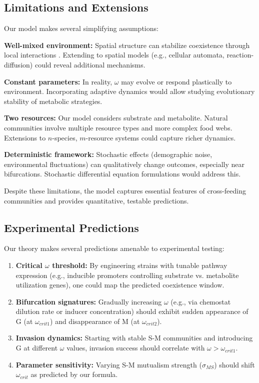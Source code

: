 \documentclass[11pt]{article}
\begin{document}
\subsection{Limitations and Extensions}

Our model makes several simplifying assumptions:

\textbf{Well-mixed environment:} Spatial structure can stabilize coexistence through local interactions \cite{momeni2013strong,dal2014resource}. Extending to spatial models (e.g., cellular automata, reaction-diffusion) could reveal additional mechanisms.

\textbf{Constant parameters:} In reality, $\omega$ may evolve or respond plastically to environment. Incorporating adaptive dynamics would allow studying evolutionary stability of metabolic strategies.

\textbf{Two resources:} Our model considers substrate and metabolite. Natural communities involve multiple resource types and more complex food webs. Extensions to $n$-species, $m$-resource systems could capture richer dynamics.

\textbf{Deterministic framework:} Stochastic effects (demographic noise, environmental fluctuations) can qualitatively change outcomes, especially near bifurcations. Stochastic differential equation formulations would address this.

Despite these limitations, the model captures essential features of cross-feeding communities and provides quantitative, testable predictions.

\subsection{Experimental Predictions}

Our theory makes several predictions amenable to experimental testing:

\begin{enumerate}
\item \textbf{Critical $\omega$ threshold:} By engineering strains with tunable pathway expression (e.g., inducible promoters controlling substrate vs. metabolite utilization genes), one could map the predicted coexistence window.

\item \textbf{Bifurcation signatures:} Gradually increasing $\omega$ (e.g., via chemostat dilution rate or inducer concentration) should exhibit sudden appearance of G (at $\omega_{crit1}$) and disappearance of M (at $\omega_{crit2}$).

\item \textbf{Invasion dynamics:} Starting with stable S-M communities and introducing G at different $\omega$ values, invasion success should correlate with $\omega > \omega_{crit1}$.

\item \textbf{Parameter sensitivity:} Varying S-M mutualism strength ($\sigma_{MS}$) should shift $\omega_{crit}$ as predicted by our formula.
\end{enumerate}
\end{document}
